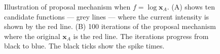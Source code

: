 \documentclass[oneside, 12 pt]{book}
\begin{document}
  \begin{figure}[t]
   \begin{center} 
     \quad
    \end{center}     
    \caption{ Illustration of proposal mechanism when $f = \log \mathbf{x}_A$. (A) shows ten candidate functions --- grey lines --- where the current intensity is shown by the red line. (B) 100 iterations of the proposal mechanism where the original $\mathbf{x}_A$ is the red line. The iterations progress from black to blue. The black ticks show the spike times.}
    \label{fig:current}
    \hrulefill
    \end{figure}
\end{document}
